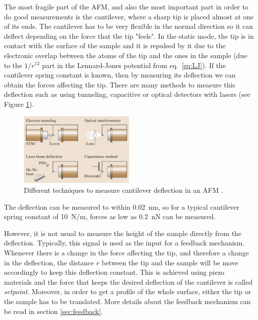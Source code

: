 \documentclass[11pt,a4paper]{article}
\begin{document}
The most fragile part of the AFM, and also the most important part in order to do good measurements is the cantilever, where a sharp tip is placed almost at one of its ends. The cantilever has to be very flexible in the normal direction so it can deflect depending on the force that the tip "feels". In the static mode, the tip is in contact with the surface of the sample and it is repulsed by it due to the electronic overlap between the atoms of the tip and the ones in the sample (due to the $1/r^{12}$ part in the Lennard-Jones potential from eq.~\eqref{eq:LJ}). If the cantilever spring constant is known, then by measuring its deflection we can obtain the forces affecting the tip. There are many methods to measure this deflection such as using tunneling, capacitive or optical detectors with lasers (see Figure \ref{fig:Deflection_measurement}).

\begin{figure}[ht]
\centering
\includegraphics[width=0.5\textwidth]{Deflection}
\caption{Different techniques to measure cantilever deflection in an AFM \cite{Bhushan}.}
\label{fig:Deflection_measurement}
\end{figure}

The deflection can be measured to within \SI{0.02}{\nm}, so for a typical cantilever spring constant of \SI{10}{\N/\m}, forces as low as \SI{0.2}{\nano\N} can be measured.

However, it is not usual to measure the height of the sample directly from the deflection. Typically, this signal is used as the input for a feedback mechanism. Whenever there is a change in the force affecting the tip, and therefore a change in the deflection, the distance $r$ between the tip and the sample will be move accordingly to keep this deflection constant. This is achieved using piezo materials and the force that keeps the desired deflection of the cantilever is called \emph{setpoint}. Moreover, in order to get a profile of the whole surface, either the tip or the sample has to be translated. More details about the feedback mechanism can be read in section \ref{sec:feedback}.
\end{document}
